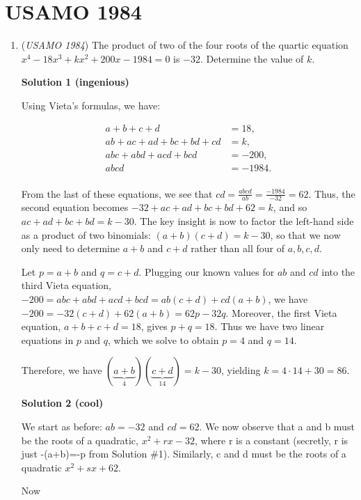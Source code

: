 \section{USAMO 1984}
        \begin{enumerate}
        	\item (\textit{USAMO 1984}) The product of two of the four roots of the quartic equation $x^4 - 18x^3 + kx^2+200x-1984=0$ is $-32$. Determine the value of $k$.


 



\textbf{Solution 1 (ingenious)}

Using Vieta's formulas, we have: 

 
 \begin{align*}a+b+c+d &= 18,\\ ab+ac+ad+bc+bd+cd &= k,\\ abc+abd+acd+bcd &=-200,\\ abcd &=-1984.\\ \end{align*}
 

 
 From the last of these equations, we see that $cd = \frac{abcd}{ab} = \frac{-1984}{-32} = 62$. Thus, the second equation becomes $-32+ac+ad+bc+bd+62=k$, and so $ac+ad+bc+bd=k-30$. The key insight is now to factor the left-hand side as a product of two binomials: $(a+b)(c+d)=k-30$, so that we now only need to determine $a+b$ and $c+d$ rather than all four of $a,b,c,d$. 

 Let $p=a+b$ and $q=c+d$. Plugging our known values for $ab$ and $cd$ into the third Vieta equation, $-200 = abc+abd + acd + bcd = ab(c+d) + cd(a+b)$, we have $-200 = -32(c+d) + 62(a+b) = 62p-32q$. Moreover, the first Vieta equation, $a+b+c+d=18$, gives $p+q=18$. Thus we have two linear equations in $p$ and $q$, which we solve to obtain $p=4$ and $q=14$. 

 Therefore, we have $(\underbrace{a+b}_4)(\underbrace{c+d}_{14}) = k-30$, yielding $k=4\cdot 14+30 = \boxed{86}$.

 



\textbf{Solution 2 (cool)}

We start as before: $ab=-32$ and $cd=62$. We now observe that a and b must be the roots of a quadratic, $x^2+rx-32$, where r is a constant (secretly, r is just -(a+b)=-p from Solution \#1). Similarly, c and d must be the roots of a quadratic $x^2+sx+62$. 

 Now 


\end{enumerate}
